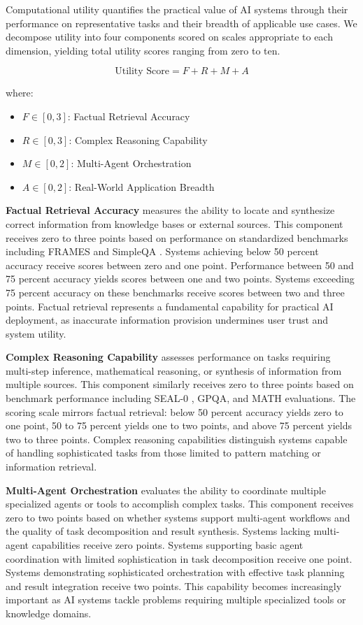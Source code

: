 Computational utility quantifies the practical value of AI systems through their performance on representative tasks and their breadth of applicable use cases. We decompose utility into four components scored on scales appropriate to each dimension, yielding total utility scores ranging from zero to ten.

\begin{equation}
\text{Utility Score} = F + R + M + A
\label{eq:utility}
\end{equation}

where:
\begin{itemize}
    \item $F \in [0, 3]$: Factual Retrieval Accuracy
    \item $R \in [0, 3]$: Complex Reasoning Capability  
    \item $M \in [0, 2]$: Multi-Agent Orchestration
    \item $A \in [0, 2]$: Real-World Application Breadth
\end{itemize}

\textbf{Factual Retrieval Accuracy} measures the ability to locate and synthesize correct information from knowledge bases or external sources. This component receives zero to three points based on performance on standardized benchmarks including FRAMES \cite{frames2024} and SimpleQA \cite{simpleqa2024}. Systems achieving below 50 percent accuracy receive scores between zero and one point. Performance between 50 and 75 percent accuracy yields scores between one and two points. Systems exceeding 75 percent accuracy on these benchmarks receive scores between two and three points. Factual retrieval represents a fundamental capability for practical AI deployment, as inaccurate information provision undermines user trust and system utility.

\textbf{Complex Reasoning Capability} assesses performance on tasks requiring multi-step inference, mathematical reasoning, or synthesis of information from multiple sources. This component similarly receives zero to three points based on benchmark performance including SEAL-0 \cite{sealqa2025}, GPQA, and MATH evaluations. The scoring scale mirrors factual retrieval: below 50 percent accuracy yields zero to one point, 50 to 75 percent yields one to two points, and above 75 percent yields two to three points. Complex reasoning capabilities distinguish systems capable of handling sophisticated tasks from those limited to pattern matching or information retrieval.

\textbf{Multi-Agent Orchestration} evaluates the ability to coordinate multiple specialized agents or tools to accomplish complex tasks. This component receives zero to two points based on whether systems support multi-agent workflows and the quality of task decomposition and result synthesis. Systems lacking multi-agent capabilities receive zero points. Systems supporting basic agent coordination with limited sophistication in task decomposition receive one point. Systems demonstrating sophisticated orchestration with effective task planning and result integration receive two points. This capability becomes increasingly important as AI systems tackle problems requiring multiple specialized tools or knowledge domains.

